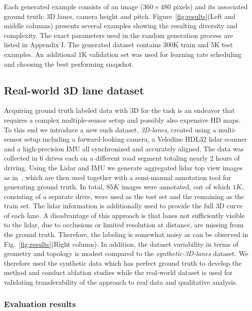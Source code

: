 \documentclass[10pt,twocolumn,letterpaper]{article}
\begin{document}
Each generated example consists of an image ($360\times480$ pixels) and its associated ground truth: 3D lanes, camera height and pitch. Figure~\ref{fig:results}(Left and middle columns) presents several examples showing the resulting diversity and complexity. The exact parameters used in the random generation process are listed in Appendix I. The generated dataset contains 300K train and 5K test examples. An additional 1K validation set was used for learning rate scheduling and choosing the best performing snapshot.


\subsection{Real-world 3D lane dataset}

Acquiring ground truth labeled data with 3D for the task is an endeavor that requires a complex multiple-sensor setup and possibly also expensive HD maps. To this end we introduce a new such dataset, \textit{3D-lanes}, created using a multi-sensor setup including a forward-looking camera, a Velodine HDL32 lidar scanner and a high-precision IMU all synchronized and accurately aligned. The data was collected in 6 drives each on a different road segment totaling nearly 2 hours of driving. Using the Lidar and IMU we generate aggregated lidar top view images as in~\cite{Urmson_boss}, which are then used together with a semi-manual annotation tool for generating ground truth. In total, $85K$ images were annotated, out of which $1K$, consisting of a separate drive, were used as the test set and the remaining as the train set. The lidar information is additionally used to provide the full 3D curve of each lane. A disadvantage of this approach is that lanes not sufficiently visible to the lidar, due to occlusions or limited resolution at distance, are missing from the ground truth. Therefore, the labeling is somewhat noisy as can be observed in Fig.~\ref{fig:results}(Right column). In addition, the dataset variability in terms of geometry and topology is modest compared to the \emph{synthetic-3D-lanes} dataset. We therefore used the synthetic data which has perfect ground truth to develop the method and conduct ablation studies while the real-world dataset is used for validating transferability of the approach to real data and qualitative analysis. 

\subsubsection{Evaluation results}
\end{document}
